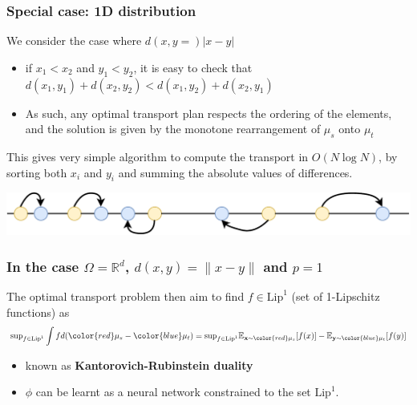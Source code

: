 \documentclass[french,9pt]{beamer}
\newcommand{\red}[1]{{\color{red} #1}}
\newcommand{\blue}[1]{{\color{blue} #1}}
\newcommand{\x}{{\bf x}}
\newcommand{\y}{{\bf y}}
\begin{document}
\begin{frame}
  \frametitle{Special case: 1D distribution}
We consider the case where $d(x,y=)|x - y|$ 
\begin{itemize}
\item if $x_{1} < x_{2}$ and $y_{1} < y_{2}$, it is easy to check that $d(x_{1},y_{1})+d(x_{2},y_{2})<d(x_{1},y_{2})+d(x_{2},y_{1})$
\item As such, any optimal transport plan respects the ordering of the elements, and the solution is given by the monotone rearrangement of $\mu_{s}$ onto $\mu_{t}$
\end{itemize}
This gives very simple algorithm to compute the transport in $O(N\log N)$, by sorting both $x_{i}$ and $y_{i}$ and summing the absolute values of differences.
  \begin{center}
      \includegraphics[width=0.9\linewidth]{fig/transp1D}
  \end{center}
\end{frame}



\begin{frame}
  \frametitle{In the case $\Omega=\mathbb{R}^{d}$, $d(x,y)=\|x-y\|$ and $p=1$}

The optimal transport problem then aim to find $f \in \text{Lip}^1$ (set of 1-Lipschitz functions) as
\begin{equation}
\text{sup}_{f \in \text{Lip}^1} \int f d(\red {\mu_{s}} - \blue{\mu_{t}}) = \text{sup}_{f \in \text{Lip}^1} \mathbb{E}_{\x\sim\red {\mu_{s}} } [f(x)] - \mathbb{E}_{\y\sim\blue{\mu_{t}} } [f(y)]
\end{equation}
\begin{itemize}
\item known as {\bf Kantorovich-Rubinstein duality}
\item $\phi$ can be learnt as a neural network constrained to the set $\text{Lip}^1$.
\end{itemize}

\end{frame}


\end{document}
